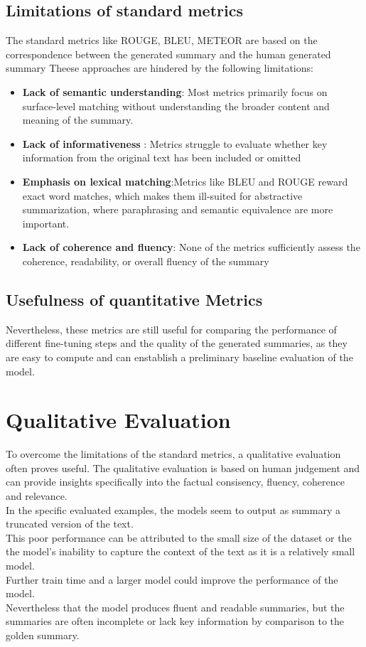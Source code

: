\documentclass[11pt,a4paper]{article}
\begin{document}
\subsection{Limitations of standard metrics}
The standard metrics like ROUGE, BLEU, METEOR are based on the correspondence between the generated summary and the human generated summary
Theese approaches are hindered by the following limitations:
\raggedright
\begin{itemize}
    \item \textbf{Lack of semantic understanding}: Most metrics primarily focus on surface-level matching without understanding the broader content and meaning of the summary.
    \item \textbf{Lack of informativeness }: Metrics struggle to evaluate whether key information from the original text has been included or omitted
    \item \textbf{Emphasis on lexical matching}:Metrics like BLEU and ROUGE reward exact word matches, which makes them ill-suited for abstractive summarization, where paraphrasing and semantic equivalence are more important.
    \item \textbf{Lack of coherence and fluency}: None of the metrics sufficiently assess the coherence, readability, or overall fluency of the summary
\end{itemize}
\subsection{Usefulness of quantitative Metrics}
Nevertheless, these metrics are still useful for comparing the performance of different fine-tuning steps
 and the quality of the generated summaries,
as they are easy to compute and can enstablish a preliminary baseline evaluation of the model.

\section{Qualitative Evaluation}
To overcome the limitations of the standard metrics, a qualitative evaluation often proves useful.
The qualitative evaluation is based on human judgement and can provide insights specifically into
the factual consisency, fluency, coherence and relevance.
\\In the specific evaluated examples, the models seem to output as summary a truncated version of the text.
\\This poor performance can be attributed to the small size of the dataset or the the model's inability to capture the context of the text as it is a relatively small model. 
\\Further train time and a larger model could improve the performance of the model.
\\Nevertheless that the model produces fluent and readable summaries, but the summaries are often incomplete or lack key information by comparison to the golden summary.
 
\end{document}
